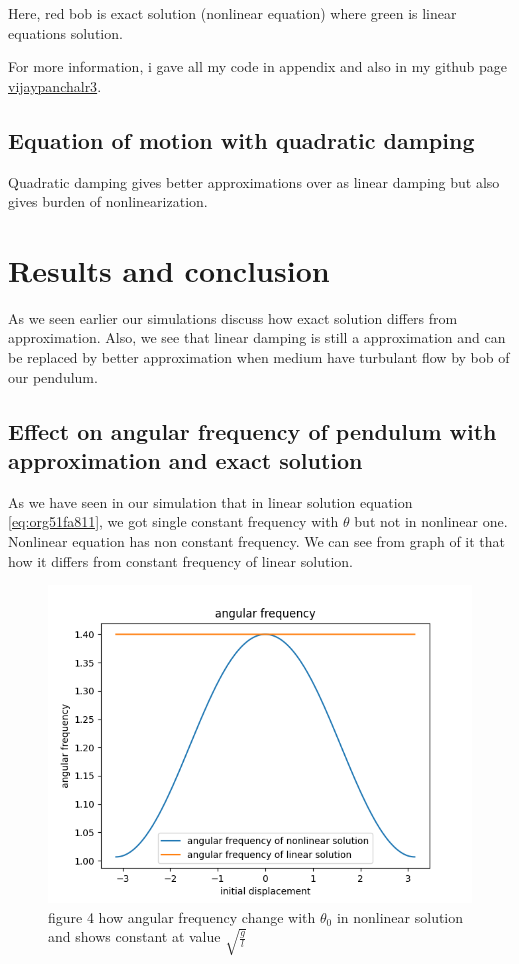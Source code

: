 \documentclass[11pt,a4paper]{article}
\begin{document}
Here, red bob is exact solution (nonlinear equation) where green is linear equations solution.

For more information, i gave all my code in appendix and also in my github page \href{https://github.com/vijaypanchalr3}{vijaypanchalr3}.

\subsection{Equation of motion with quadratic damping}
\label{sec:org0a4eb34}

Quadratic damping gives better approximations over as linear damping but also gives burden of nonlinearization. 


\section{Results and conclusion}
\label{sec:org893982d}

As we seen earlier our simulations discuss how exact solution differs from approximation. Also, we see that linear damping is still a approximation and can be replaced by better approximation when medium have turbulant flow by bob of our pendulum.

\subsection{Effect on angular frequency of pendulum with approximation and exact solution}
\label{sec:orgb8bb19b}

As we have seen in our simulation that in linear solution equation \ref{eq:org51fa811}, we got single constant frequency with \(\theta\) but not in nonlinear one. Nonlinear equation has non constant frequency. We can see from graph of it that how it differs from constant frequency of linear solution.

\begin{figure}[htbp]
\centering
\includegraphics[width=0.8 \textwidth]{angfre.png}
\caption{\label{fig:org259381a}figure 4   how angular frequency change with \(\theta_{0}\) in nonlinear solution and shows constant at value \(\sqrt{\frac{g}{l}}\)}
\end{figure}
\end{document}
